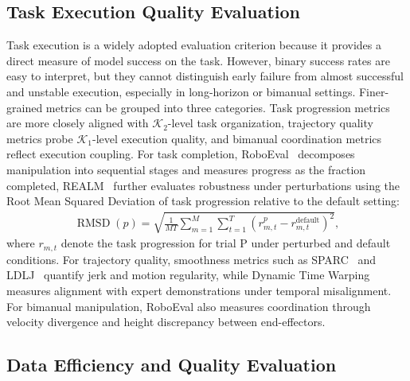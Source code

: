 \documentclass[acmsmall,screen,review]{acmart}
\begin{document}
\subsection{Task Execution Quality Evaluation}\label{sec:eval_task_execution}

Task execution is a widely adopted evaluation criterion because it provides a direct measure of model success on the task.
However, binary success rates are easy to interpret, but they cannot distinguish early failure from almost successful and unstable execution, especially in long-horizon or bimanual settings. 
Finer-grained metrics can be grouped into three categories.
Task progression metrics are more closely aligned with \(\mathcal{K}_2\)-level task organization, trajectory quality metrics probe \(\mathcal{K}_1\)-level execution quality, and bimanual coordination metrics reflect execution coupling.
For task completion, RoboEval~\cite{wang2025roboeval} decomposes manipulation into sequential stages and measures progress as the fraction completed, 
REALM~\cite{sedlacek2025realm} further evaluates robustness under perturbations using the Root Mean Squared Deviation of task progression relative to the default setting:
\begin{align}
  \operatorname{RMSD}(p) = \sqrt{\frac{1}{MT}\sum_{m=1}^{M}\sum_{t=1}^{T}{\left(r_{m,t}^{p}-r_{m,t}^{\text{default}}\right)}^{2}},
  \label{eq:rmsd}
\end{align}
where $r_{m,t}$  denote the task progression for trial P under perturbed and default conditions.
For trajectory quality, smoothness metrics such as SPARC~\cite{balasubramanian2015sparc} and LDLJ~\cite{antonelli2023movement} quantify jerk and motion regularity, while Dynamic Time Warping measures alignment with expert demonstrations under temporal misalignment. 
For bimanual manipulation, RoboEval also measures coordination through velocity divergence and height discrepancy between end-effectors.

\subsection{Data Efficiency and Quality Evaluation}\label{sec:eval_data_sample}
\end{document}
